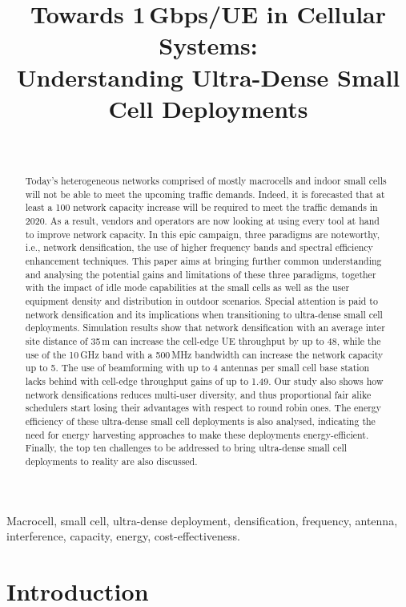\documentclass{IEEEtran}
\title{Towards 1\,Gbps/UE in Cellular Systems: \\ Understanding Ultra-Dense Small Cell Deployments}
\author{
\IEEEauthorblockN{David L\'opez-P\'erez, Ming Ding, Holger Claussen, and Amir H. Jafari}\\
\IEEEauthorblockA{\textit{  Bell Laboratories, Alcatel-Lucent, Republic of Ireland}\\
\textit{ National ICT Australia (NICTA), Australia}\\
\textit{ University of Sheffield, United Kingdom}}
}
\begin{document}
\maketitle
\begin{abstract}
Today's heterogeneous networks comprised of mostly macrocells and indoor small cells
will not be able to meet the upcoming traffic demands.
Indeed, it is forecasted that at least a 100 network capacity increase will be required to meet the traffic demands in 2020.
As a result,
vendors and operators are now looking at using every tool at hand to improve network capacity.
In this epic campaign, three paradigms are noteworthy,
i.e., network densification, the use of higher frequency bands and spectral efficiency enhancement techniques.
This paper aims at bringing further common understanding
and analysing the potential gains and limitations of these three paradigms,
together with the impact of
idle mode capabilities at the small cells as well as the user equipment density and distribution in outdoor scenarios.
Special attention is paid to network densification and its implications when transitioning to ultra-dense small cell deployments.
Simulation results show that network densification with an average inter site distance of 35\,m can increase the cell-edge UE throughput by up to 48,
while the use of the 10\,GHz band with a 500\,MHz bandwidth can increase the network capacity up to 5.
The use of beamforming with up to 4 antennas per small cell base station lacks behind with cell-edge throughput gains of up to 1.49.
Our study also shows how network densifications reduces multi-user diversity,
and thus proportional fair alike schedulers start losing their advantages with respect to round robin ones.
The energy efficiency of these ultra-dense small cell deployments is also analysed,
indicating the need for energy harvesting approaches to make these deployments energy-efficient.
Finally, the top ten challenges to be addressed to bring ultra-dense small cell deployments to reality are also discussed.


\end{abstract}
\begin{IEEEkeywords}
Macrocell, small cell, ultra-dense deployment, densification, frequency, antenna, interference, capacity, energy, cost-effectiveness.
\end{IEEEkeywords}
\section{Introduction}
\label{introduction}
\end{document}
